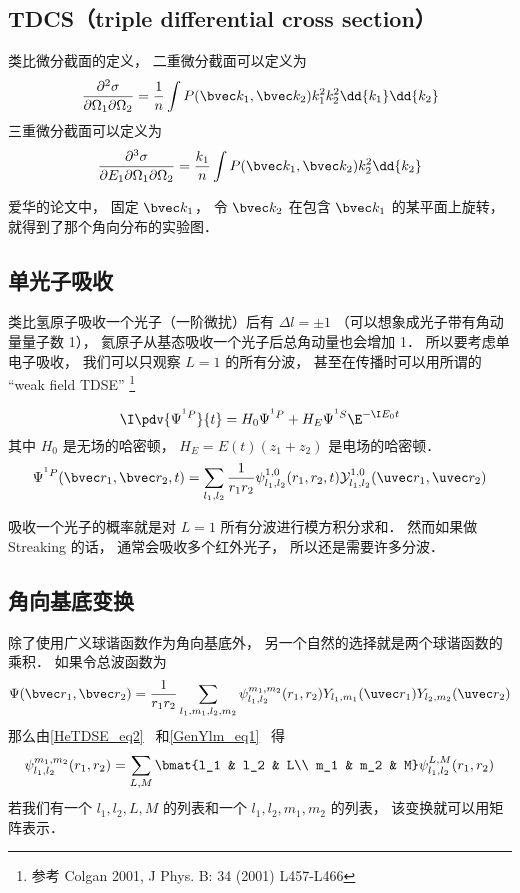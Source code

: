 \subsection{TDCS（triple differential cross section）}
类比微分截面的定义， 二重微分截面可以定义为
\begin{equation}
\frac{\partial^2\sigma}{\partial\Omega_1\partial\Omega_2} = \frac{1}{n} \int P(\bvec k_1, \bvec k_2)k_1^2k_2^2\dd{k_1}\dd{k_2}
\end{equation}
三重微分截面可以定义为
\begin{equation}
\frac{\partial^3\sigma}{\partial E_1\partial\Omega_1\partial\Omega_2} = \frac{k_1}{n} \int P(\bvec k_1, \bvec k_2)k_2^2\dd{k_2}
\end{equation}

爱华的论文中， 固定 $\bvec k_1$， 令 $\bvec k_2$ 在包含 $\bvec k_1$ 的某平面上旋转， 就得到了那个角向分布的实验图．

\subsection{单光子吸收}

类比氢原子吸收一个光子（一阶微扰）后有 $\Delta l = \pm 1$ （可以想象成光子带有角动量量子数 1）， 氦原子从基态吸收一个光子后总角动量也会增加 1． 所以要考虑单电子吸收， 我们可以只观察 $L = 1$ 的所有分波， 甚至在传播时可以用所谓的 “weak field TDSE” \footnote{参考 Colgan 2001, J Phys. B: 34 (2001) L457-L466}

\begin{equation}
\I \pdv{\Psi^{^1P}}{t} = H_0 \Psi^{^1P} + H_E \Psi^{^1S} \E^{-\I E_0 t}
\end{equation}
其中 $H_0$ 是无场的哈密顿， $H_E = E(t) (z_1 + z_2)$ 是电场的哈密顿．
\begin{equation}
\Psi^{^1P}(\bvec r_1, \bvec r_2, t) = \sum_{l_1, l_2} \frac{1}{r_1 r_2} \psi_{l_1, l_2}^{1, 0} (r_1, r_2, t) \mathcal Y_{l_1, l_2}^{1, 0} (\uvec r_1, \uvec r_2)
\end{equation}

吸收一个光子的概率就是对 $L = 1$ 所有分波进行模方积分求和． 然而如果做 Streaking 的话， 通常会吸收多个红外光子， 所以还是需要许多分波．

\subsection{角向基底变换}
除了使用广义球谐函数作为角向基底外， 另一个自然的选择就是两个球谐函数的乘积． 如果令总波函数为
\begin{equation}\label{HeAnal_eq6}
\Psi(\bvec r_1, \bvec r_2) = \frac{1}{r_1 r_2} \sum_{l_1, m_1, l_2, m_2} \psi_{l_1, l_2}^{m_1, m_2}(r_1, r_2) Y_{l_1, m_1}(\uvec r_1) Y_{l_2, m_2} (\uvec r_2)
\end{equation}
那么由\autoref{HeTDSE_eq2}~ 和\autoref{GenYlm_eq1}~ 得
\begin{equation}\label{HeAnal_eq7}
\psi_{l_1, l_2}^{m_1, m_2}(r_1, r_2) = \sum_{L,M} \bmat{l_1 & l_2 & L\\ m_1 & m_2 & M} \psi_{l_1, l_2}^{L,M}(r_1, r_2)
\end{equation}
若我们有一个 $l_1, l_2, L, M$ 的列表和一个 $l_1, l_2, m_1, m_2$ 的列表， 该变换就可以用矩阵表示．

